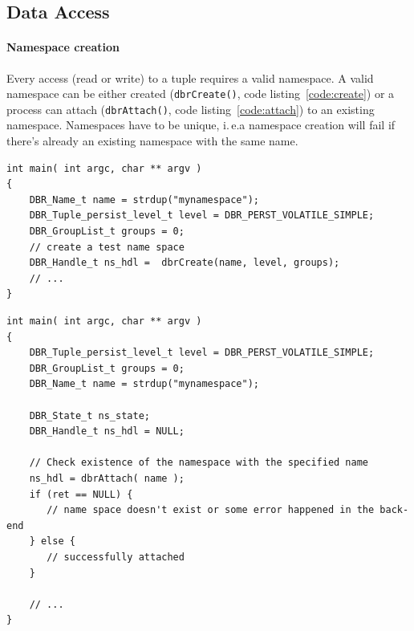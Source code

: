 \subsection{Data Access}
\label{sec:interface:access}
\paragraph{Namespace creation} Every access (read or write) to a tuple
requires a valid namespace.  A valid namespace can be either created
(\texttt{dbrCreate()}, code listing~\ref{code:create}) or a process
can attach (\texttt{dbrAttach()}, code listing~\ref{code:attach}) to
an existing namespace.  Namespaces have to be unique, i.\,e.\@ a
namespace creation will fail if there's already an existing namespace
with the same name.

\begin{lstlisting}[style=mystyle,basicstyle=\scriptsize\ttfamily,caption=Creation of a namespace, label=code:create]
int main( int argc, char ** argv )
{
	DBR_Name_t name = strdup("mynamespace");
	DBR_Tuple_persist_level_t level = DBR_PERST_VOLATILE_SIMPLE;
	DBR_GroupList_t groups = 0;
	// create a test name space
	DBR_Handle_t ns_hdl =  dbrCreate(name, level, groups);
	// ...
}
\end{lstlisting}

\begin{lstlisting}[style=mystyle,basicstyle=\scriptsize\ttfamily,caption=Attach to a namespace, label=code:attach]
int main( int argc, char ** argv ) 
{
	DBR_Tuple_persist_level_t level = DBR_PERST_VOLATILE_SIMPLE;
	DBR_GroupList_t groups = 0;
	DBR_Name_t name = strdup("mynamespace");
	
	DBR_State_t ns_state;
	DBR_Handle_t ns_hdl = NULL;
	
	// Check existence of the namespace with the specified name
    ns_hdl = dbrAttach( name );
    if (ret == NULL) {
       // name space doesn't exist or some error happened in the back-end
    } else {
       // successfully attached
    }
		
	// ...
}
\end{lstlisting}

